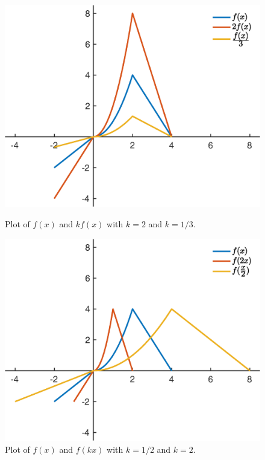 \documentclass[12pt]{article}
\newcommand{\widthtwofigures}{0.47\textwidth}
\begin{document}
\begin{figure}[htp]
\centering
\begin{minipage}[t]{\widthtwofigures}
\centering
\vspace{0pt}
\includegraphics[width=\textwidth]{stretchshrinkvertical}
\caption{Plot of $f(x)$ and $kf(x)$ with $k = 2$ and $k = 1/3$.}
\end{minipage}\hfill
\begin{minipage}[t]{\widthtwofigures}
\centering
\vspace{0pt}
\includegraphics[width=\textwidth]{stretchshrinkhorizontal}
\caption{Plot of $f(x)$ and $f(kx)$ with $k = 1/2$ and $k = 2$.}
\end{minipage}
\end{figure}
\end{document}
